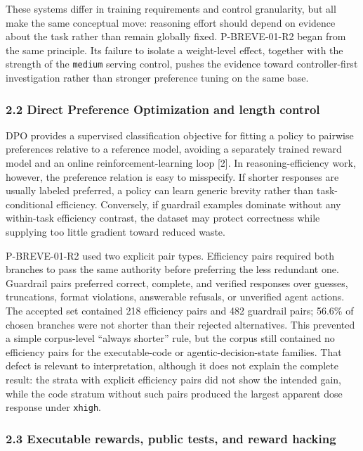 \documentclass[
  9pt,
  letterpaper,
]{article}
\begin{document}
These systems differ in training requirements and control granularity,
but all make the same conceptual move: reasoning effort should depend on
evidence about the task rather than remain globally fixed. P-BREVE-01-R2
began from the same principle. Its failure to isolate a weight-level
effect, together with the strength of the \texttt{medium} serving
control, pushes the evidence toward controller-first investigation
rather than stronger preference tuning on the same base.

\hypertarget{22-direct-preference-optimization-and-length-control}{%
\subsubsection{2.2 Direct Preference Optimization and length
control}\label{22-direct-preference-optimization-and-length-control}}

DPO provides a supervised classification objective for fitting a policy
to pairwise preferences relative to a reference model, avoiding a
separately trained reward model and an online reinforcement-learning
loop {[}2{]}. In reasoning-efficiency work, however, the preference
relation is easy to misspecify. If shorter responses are usually labeled
preferred, a policy can learn generic brevity rather than
task-conditional efficiency. Conversely, if guardrail examples dominate
without any within-task efficiency contrast, the dataset may protect
correctness while supplying too little gradient toward reduced waste.

P-BREVE-01-R2 used two explicit pair types. Efficiency pairs required
both branches to pass the same authority before preferring the less
redundant one. Guardrail pairs preferred correct, complete, and verified
responses over guesses, truncations, format violations, answerable
refusals, or unverified agent actions. The accepted set contained 218
efficiency pairs and 482 guardrail pairs; 56.6\% of chosen branches were
not shorter than their rejected alternatives. This prevented a simple
corpus-level ``always shorter'' rule, but the corpus still contained no
efficiency pairs for the executable-code or agentic-decision-state
families. That defect is relevant to interpretation, although it does
not explain the complete result: the strata with explicit efficiency
pairs did not show the intended gain, while the code stratum without
such pairs produced the largest apparent dose response under
\texttt{xhigh}.

\hypertarget{23-executable-rewards-public-tests-and-reward-hacking}{%
\subsubsection{2.3 Executable rewards, public tests, and reward
hacking}\label{23-executable-rewards-public-tests-and-reward-hacking}}
\end{document}
